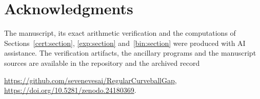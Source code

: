 \section*{Acknowledgments}
The manuscript, its exact arithmetic verification and the computations of
Sections~\ref{cert:section}, \ref{exp:section} and~\ref{bin:section} were produced
with AI assistance. The verification artifacts, the ancillary programs and
the manuscript sources are available in the repository and the archived
record
\begin{center}
\url{https://github.com/sevenevesai/RegularCurveballGap},\\
\url{https://doi.org/10.5281/zenodo.24180369}.
\end{center}

